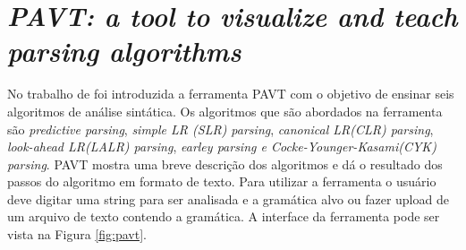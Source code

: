 
\section{\textit{PAVT: a tool to visualize and teach parsing algorithms}}
No trabalho de \textcite{sangal2018pavt} foi introduzida a ferramenta PAVT com o objetivo de ensinar seis algoritmos de análise sintática. Os algoritmos que são abordados na ferramenta são \textit{predictive parsing}, \textit{simple LR (SLR) parsing}, \textit{canonical LR(CLR) parsing}, \textit{look-ahead LR(LALR) parsing}, \textit{earley parsing e Cocke-Younger-Kasami(CYK) parsing}. PAVT mostra uma breve descrição dos algoritmos e dá o resultado dos passos do algoritmo em formato de texto. Para utilizar a ferramenta o usuário deve digitar uma string para ser analisada e a gramática alvo ou fazer upload de um arquivo de texto contendo a gramática. A interface da ferramenta pode ser vista na Figura \ref{fig:pavt}.
\begin{figure}[h]
    \captionsetup{width=16cm}
\end{figure}

